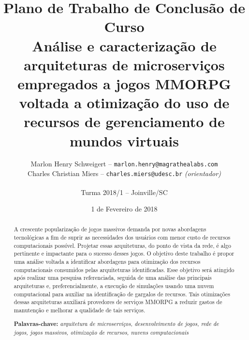 \documentclass[11pt]{article}
\begin{document}
\pagestyle{fancy}

\title{
Plano de Trabalho de Conclusão de Curso\\
Análise e caracterização de arquiteturas de microserviços empregados a jogos MMORPG voltada a otimização do uso de recursos de gerenciamento de mundos virtuais
}

\author{
Marlon Henry Schweigert -- \texttt{marlon.henry@magrathealabs.com}\\
Charles Christian Miers -- \texttt{charles.miers@udesc.br} {\it (orientador)}\\
~\\
Turma 2018/1 -- Joinville/SC
}

\date{1 de Fevereiro de 2018}

\maketitle


\onehalfspacing  %


\begin{abstract}
\noindent
  A crescente popularização de jogos massivos demanda por novas abordagens tecnológicas a fim de suprir as necessidades dos usuários com menor custo de recursos computacionais possível.
  Projetar essas arquiteturas, do ponto de vista da rede, é algo pertinente e impactante para o sucesso desses jogos.
  O objetivo deste trabalho é propor uma análise voltada a identificar abordagens para otimização dos recursos computacionais consumidos pelas arquiteturas identificadas.
  Esse objetivo será atingido após realizar uma pesquisa referenciada, seguida de uma análise das principais arquiteturas e, preferencialmente, a execução de simulações usando uma nuvem computacional para auxiliar na identificação de gargalos de recursos. %
  Tais otimizações dessas arquiteturas auxiliará provedores de serviços MMORPG a reduzir gastos de manutenção e melhorar a qualidade de tais serviços.

\textbf{Palavras-chave:} \textit{arquitetura de microserviços, desenvolvimento de jogos, rede de jogos, jogos massivos, otimização de recursos, nuvens computacionais}
\end{abstract}












\end{document}
